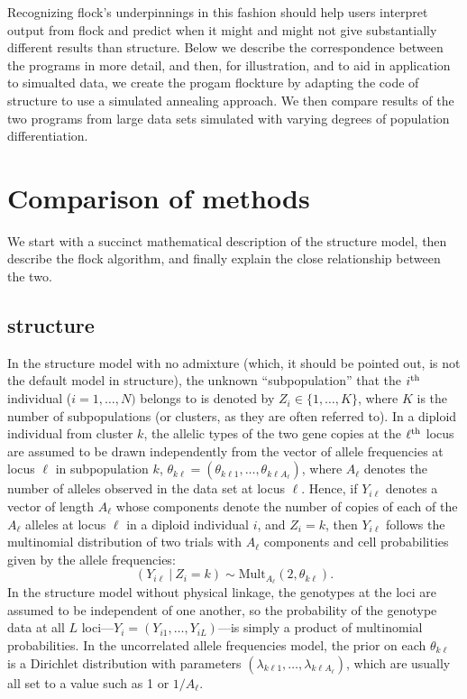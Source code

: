 Recognizing {\sc flock}'s underpinnings in this fashion should help users
interpret output from {\sc flock} and predict when it might and might not
give substantially different results than {\sc structure}. Below we describe
the correspondence between the programs in more detail, and then, for illustration,
and to aid in application to simualted data, we
create the progam {\sc flockture} by adapting the code of {\sc structure} to 
use a simulated annealing approach. We then compare results of the two
programs from large 
data sets simulated with varying degrees of population differentiation. 

\section*{Comparison of methods}
We start with a succinct mathematical description of the {\sc structure}
model, then describe the {\sc flock} algorithm, and finally explain
the close relationship between the two.


\subsection*{{\sc structure}}
In the {\sc structure} model with no admixture (which, it should be pointed out, 
is not the default model in {\sc structure}), the unknown ``subpopulation'' that the 
$i^\mathrm{th}$ individual ($i=1,\ldots,N)$ belongs to is denoted by $Z_i \in \{1,\ldots,K\}$, 
where $K$ is the 
number of subpopulations (or clusters, as they are often referred to).  
In a diploid individual from cluster $k$, the 
allelic types of the two gene copies at the $\ell^\mathrm{th}$ locus are assumed
to be drawn independently from the vector of allele frequencies at
locus $\ell$ in subpopulation $k$,  $\theta_{k\ell}=(\theta_{k\ell 1},\ldots,\theta_{k\ell A_\ell})$, where 
$A_\ell$ 
denotes the number of alleles observed in the data set at locus $\ell$.
Hence, if $Y_{i\ell}$ denotes a vector of length $A_\ell$ whose components denote the 
number
of copies of each of the $A_\ell$ alleles at locus $\ell$ in a diploid individual $i$, and 
$Z_i=k$, then $Y_{i\ell}$ follows the multinomial distribution of two trials with
$A_\ell$  components and cell probabilities given by the allele frequencies: 
\begin{equation}
(Y_{i\ell}~|~Z_i=k) \sim \mathrm{Mult}_{A_\ell}(2, \theta_{k\ell}).
\end{equation}
In the {\sc structure} model without physical linkage, the genotypes at the loci are assumed to
be independent of one another, so the probability of the genotype data at
all $L$ loci---$Y_i=(Y_{i1},\ldots,Y_{iL})$---is simply a product of multinomial 
probabilities.
In the uncorrelated allele frequencies model, the prior on each $\theta_{k\ell}$ is a
Dirichlet distribution with parameters $(\lambda_{k\ell1},\ldots,\lambda_{k\ell A_
\ell})$,
which are usually all set to a value such as 1 or $1/A_\ell$.  

